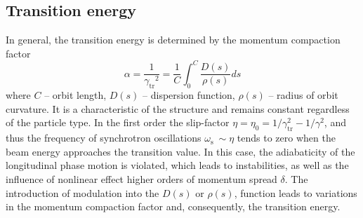 \documentclass[submitting]{nst}
\begin{document}
\subsection{Transition energy}
\par In general, the transition energy is determined by the momentum compaction factor
\begin{equation}
\alpha=\frac{1}{{\gamma_{\text{tr}}}^2}=\frac{1}{C}\int_{0}^{C}{\frac{D\left(s\right)}{\rho\left(s\right)}ds}
\end{equation}
\noindent where $C$ -- orbit length, $D(s)$ -- dispersion function, $\rho(s)$ -- radius of orbit curvature. It is a characteristic of the structure and remains constant regardless of the particle type. In the first order the slip-factor $\eta=\eta_0=1/\gamma_{\text{tr}}^2-1/\gamma^2$, and thus the frequency of synchrotron oscillations $\omega_{\text{s}}\ \sim \eta$ tends to zero when the beam energy approaches the transition value. In this case, the adiabaticity of the longitudinal phase motion is violated, which leads to instabilities, as well as the influence of nonlinear effect higher orders of momentum spread $\delta$. The introduction of modulation into the $D\left(s\right)$ or $\rho\left(s\right)$, function leads to variations in the momentum compaction factor and, consequently, the transition energy.
\end{document}
